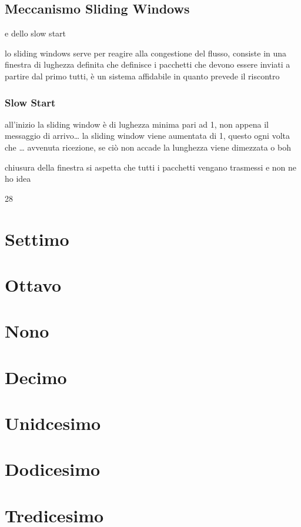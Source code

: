 \documentclass[11pt]{article}
\begin{document}
\subsection{Meccanismo Sliding Windows}
\label{sec:org7cc0b59}
e dello slow start

lo sliding windows serve per reagire alla congestione del flusso, consiste in una finestra di lughezza definita che definisce i pacchetti che devono essere inviati a partire dal primo tutti, è un sistema affidabile in quanto prevede il riscontro

\subsubsection{Slow Start}
\label{sec:org055fb8a}
all'inizio la sliding window è di lughezza minima pari ad 1, non appena il messaggio di arrivo\ldots{} la sliding window viene aumentata di 1, questo ogni volta che \ldots{} avvenuta ricezione, se ciò non accade la lunghezza viene dimezzata o boh

chiusura della finestra si aspetta che tutti i pacchetti vengano trasmessi e non ne ho idea

28

\section{Settimo}
\label{sec:org78a09cd}
\section{Ottavo}
\label{sec:orgeb0d7a3}
\section{Nono}
\label{sec:orgd138f9a}
\section{Decimo}
\label{sec:org68baf9d}
\section{Unidcesimo}
\label{sec:org560808f}
\section{Dodicesimo}
\label{sec:org3f54fe8}
\section{Tredicesimo}
\label{sec:orgaf2b263}
\end{document}
